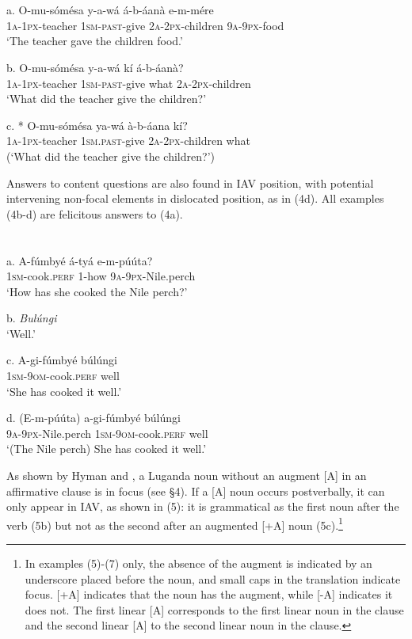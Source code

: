 \documentclass[output=paper]{langsci/langscibook}
\begin{document}
\chapter{}
\gll a.  O-mu-sómésa  y-a-wá     á-b-áanà    e-m-mére\\
       \textsc{1a-1px}{}-teacher  \textsc{1sm-past}{}-give  \textsc{2a-2px}{}-children  \textsc{9a}{}-\textsc{9px}{}-food\\
\glt   ‘The teacher gave the children food.’
\z

\gll b.  O-mu-sómésa  y-a-wá    kí  á-b-áanà?\\
       \textsc{1a-1px}{}-teacher  \textsc{1sm-past}{}-give  what  \textsc{2a-2px}{}-children\\
\glt   ‘What did the teacher give the children?’
\z

\gll c.  * O-mu-sómésa  ya-wá      à-b-áana    kí?\\
       \textsc{1a-1px}{}-teacher  \textsc{1sm.past-}give  \textsc{2a-2px}{}-children  what\\
\glt   (‘What did the teacher give the children?’)
\z

Answers to content questions are also found in IAV position, with potential intervening non-focal elements in dislocated position, as in (4d). All examples (4b-d) are felicitous answers to (4a).

\chapter{}
\gll a.  A-fúmbyé    á-tyá    e-m-púúta?\\
     \textsc{  1sm}{}-cook.\textsc{perf}  1-how    \textsc{9a}{}-\textsc{9px}{}-Nile.perch\\
\glt ‘How has she cooked the Nile perch?’
\z

\glt b.  \textit{Bulúngi}\\
  ‘Well.’
\z

\gll c.  A-gi-fúmbyé      búlúngi\\
       \textsc{1sm}{}-\textsc{9om}{}-cook.\textsc{perf}  well\\
\glt   ‘She has cooked it well.’
\z

\gll d.  (E-m-púúta)    a-gi-fúmbyé      búlúngi\\
       \textsc{9a}{}-\textsc{9px}{}-Nile.perch  \textsc{1sm}{}-\textsc{9om}{}-cook.\textsc{perf}  well\\
\glt   ‘(The Nile perch) She has cooked it well.’
\z

As shown by Hyman and \citet{Katamba1993}, a Luganda noun without an augment [A] in an affirmative clause is in focus (see §4). If a [A] noun occurs postverbally, it can only appear in IAV, as shown in (5): it is grammatical as the first noun after the verb (5b) but not as the second after an augmented [+A] noun (5c).\footnote{ In examples (5)-(7) only, the absence of the augment is indicated by an underscore placed before the noun, and small caps in the translation indicate focus. [+A] indicates that the noun has the augment, while [-A] indicates it does not.  The first linear [A] corresponds to the first linear noun in the clause and the second linear [A] to the second linear noun in the clause. }
\end{document}
